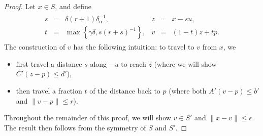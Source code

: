 
\begin{proof}

Let $x \in S$, and define
\begin{align*}
\begin{array}{cccccc}
s &=& \delta(r + 1)\delta_{\alpha}^{-1}, &
z &=& x - su, \\
t &=& \max\left\{\gamma \delta, s(r+s)^{-1}\right\}, &
v &=& (1-t)z + t p.
\end{array}
\end{align*}
The construction of $v$ has the following intuition:
to travel to $v$ from $x$, we
\begin{itemize}
\item first travel a distance $s$ along $-u$ to reach $z$ (where we will show $C'(z-p) \le d'$),
\item then travel a fraction $t$ of the distance back to $p$ (where both $A'(v - p) \le b'$ and $\|v-p\| \le r$).
\end{itemize}
Throughout the remainder of this proof, we will show $v \in S'$ and $\|x - v\| \le \epsilon$.
The result then follows from the symmetry of $S$ and $S'$.



\end{proof}
